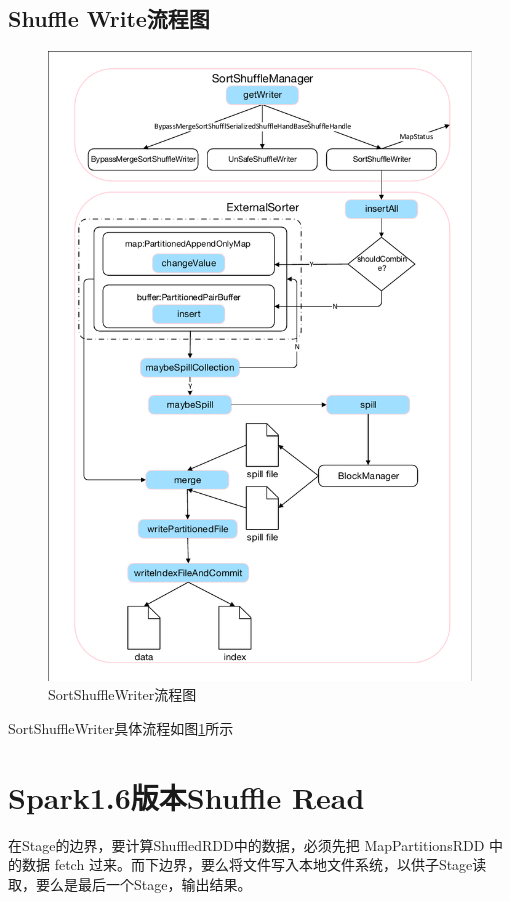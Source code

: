 \subsection{Shuffle Write流程图}
\begin{figure}[H] 
	\centering
	\includegraphics[width=\textwidth,height=0.9\textheight]{figures/sortShuffleWriter.pdf}
	\caption{SortShuffleWriter流程图}
	\label{fig:sortShuffleWriter}
\end{figure}
SortShuffleWriter具体流程如图\ref{fig:sortShuffleWriter}所示
\section{Spark1.6版本Shuffle Read}

在Stage的边界，要计算ShuffledRDD中的数据，必须先把 MapPartitionsRDD 中的数据 fetch 过来。而下边界，要么将文件写入本地文件系统，以供子Stage读取，要么是最后一个Stage，输出结果。


